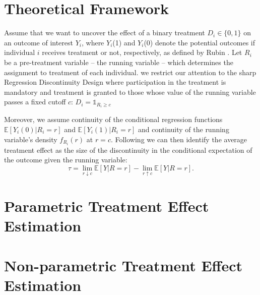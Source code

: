 \documentclass[11pt, a4paper, leqno]{article}
\begin{document}
\section{Theoretical Framework} %
\label{sec:framework}

Assume that we want to uncover the effect of a binary treatment $ D_{i} \in \lbrace 0,1 \rbrace $ on an outcome of interest $Y_{i}$, where $Y_{i}$(1) and $Y_{i}$(0) denote the potential outcomes if individual $i$ receives treatment or not, respectively, as defined by Rubin \cite{rubin}. Let $R_{i}$ be a pre-treatment variable -- the running variable -- which determines the assignment to treatment of each individual. we restrict our attention to the sharp Regression Discontinuity Design where participation in the treatment is mandatory and treatment is granted to those whose value of the running variable passes a fixed cutoff $c$: $D_{i} = \mathds{1}_{R_{i} \geq c}$

Moreover, we assume continuity of the conditional regression functions $\mathbb{E}\left[Y_{i}(0) \vert R_{i} = r\right]$ and  $\mathbb{E}\left[Y_{i}(1) \vert R_{i} = r\right]$ and continuity of the running variable's density $f_{R_{i}}(r)$ at $r=c$. Following \cite{hahn_et_al} we can then identify the average treatment effect as the size of the discontinuity in the conditional expectation of the outcome given the running variable:
\begin{equation*}
\tau = \lim_{r \downarrow c} \mathbb{E}\left[Y \vert R = r\right] - \lim_{r \uparrow c} \mathbb{E}\left[ Y \vert R = r\right].
\end{equation*}


\section{Parametric Treatment Effect Estimation} %
\label{sec: param}



\section{Non-parametric Treatment Effect Estimation} %
\label{sec: non-param}
\end{document}
